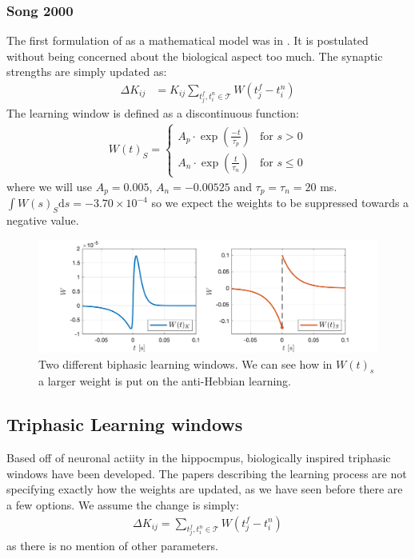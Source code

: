 \subsubsection{Song 2000}
The first formulation of \STDP as a mathematical model was in \cite{Song2000}. It is postulated without being concerned about the biological aspect too much. The synaptic strengths are simply updated as:
\begin{align}
\Delta K_{ij} &= K_{ij} \sum_{t_{j}^{f}, t_i^{n} \in \mathcal{T}} W (t_{j}^{f}-t_i^{n} ) \label{eq:SongSTDPFormulation}
\end{align}
The learning window is defined as a discontinuous function:
\begin{align}
W(t)_S =
\begin{cases}
A_{p} \cdot \exp \left(\frac{-t}{\tau_p}\right) & \text{for } s > 0 \\
A_{n} \cdot \exp \left(\frac{t}{\tau_n}\right)  & \text{for } s \leq 0
\end{cases} \label{eq:learningwindowKempter1999}
\end{align}
where we will use $A_p = 0.005$, $A_n = -0.00525$ and $\tau_p = \tau_n = 20$ ms. $\int W(s)_S \mathrm{d}s = -3.70 \times 10^{-4}$ so we expect the weights to be suppressed towards a negative value.

\begin{figure}[H]
\centering
\includegraphics[width = \textwidth]{../Figures/LearningWindowsBiphasic.png}
\caption{Two different biphasic learning windows. We can see how in $W(t)_s$ a larger weight is put on the anti-Hebbian learning.}
\label{fig:LearningWindowsBiphasic}
\end{figure}


\subsection{Triphasic Learning windows}
Based off of neuronal actiity in the hippocmpus, biologically inspired triphasic windows have been developed. The papers describing the learning process are not specifying exactly how the weights are updated, as we have seen before there are a few options. We assume the change is simply:
\begin{align}
\Delta K_{ij} =  \sum_{t_{j}^{f}, t_i^{n} \in \mathcal{T}} W (t_{j}^{f}-t_i^{n} ) \label{eq:WaddingtonSTDPFormulation}
\end{align}
as there is no mention of other parameters.

